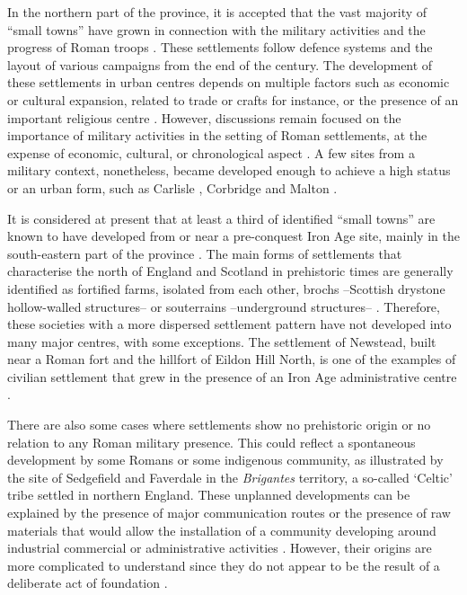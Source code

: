 
In the northern part of the province, it is accepted that the vast majority of “small towns” have grown in connection with the military activities and the progress of Roman troops \parencite[9]{Burnham_1990}. 
These settlements follow defence systems and the layout of various campaigns from the end of the  century\AD. The development of these settlements in urban centres depends on multiple factors such as economic or cultural expansion, related to trade or crafts for instance, or the presence of an important religious centre \parencites[9]{Burnham_1990}[5--6]{Frere_1975}. However, discussions remain focused on the importance of military activities in the setting of Roman settlements, at the expense of economic, cultural, or chronological aspect \parencite[for this debate, see][7--8]{Burnham_1990}. 
A few sites from a military context, nonetheless, became developed enough to achieve a high status or an urban form, such as Carlisle \parencite{McCarthy_2002}, Corbridge \parencites{Bishop_1988}{Hodgson_2008} and Malton \parencites{Wenham_1974}{Wilson_2006}.

It is considered at present that at least a third of identified “small towns” are known to have developed from or near a pre-conquest Iron Age site, mainly in the south-eastern part of the province \parencite[20]{Wacher_1995}. The main forms of settlements that characterise the north of England and Scotland in prehistoric times are generally identified as fortified farms, isolated from each other, brochs –Scottish drystone hollow-walled structures– or souterrains –underground structures– \parencite[61]{Jones_1990}. Therefore, these societies with a more dispersed settlement pattern have not developed into many major centres, with some exceptions. The settlement of Newstead, built near a Roman fort and the hillfort of Eildon Hill North, is one of the examples of civilian settlement that grew in the presence of an Iron Age administrative centre \parencite{Hunter_2012}.

There are also some cases where settlements show no prehistoric origin or no relation to any Roman military presence. This could reflect a spontaneous development by some Romans or some indigenous community, as illustrated by the site of Sedgefield \parencite{Durham_2010} and Faverdale \parencite{Proctor_2012} in the \textit{Brigantes} territory, a so-called ‘Celtic’ tribe settled in northern England. These unplanned developments can be explained by the presence of major communication routes or the presence of raw materials that would allow the installation of a community developing around industrial commercial or administrative activities \parencite[5--6]{Frere_1975}. However, their origins are more complicated to understand since they do not appear to be the result of a deliberate act of foundation \parencite[55]{Jones_1991}.

